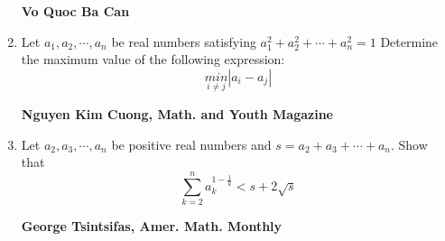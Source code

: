 \documentclass{article}
\begin{document}
\begin{enumerate}
\begin{flushright}
	\textbf{Vo Quoc Ba Can}
\end{flushright}
\item Let $a_1, a_2,\cdots , a_n$ be real numbers satisfying $a_1^2 + a_2^2 +\cdots + a_n^2 = 1$ Determine the maximum value of the following expression:$$ \underset{i\neq j}{min}\left|a_i-a_j \right|  $$
\begin{flushright}
	\textbf{Nguyen Kim Cuong, Math. and Youth Magazine}
\end{flushright}
\pagebreak
\item Let $a_2, a_3,\cdots , a_n$ be positive real numbers and $s = a_2 + a_3 + \cdots + a_n$. Show that$$\sum \limits_{k=2}^n a_k^{1-\frac{1}{k}}<s+2\sqrt{s}$$
\begin{flushright}
	\textbf{George Tsintsifas, Amer. Math. Monthly}
\end{flushright}
\end {enumerate}
\end{document}
